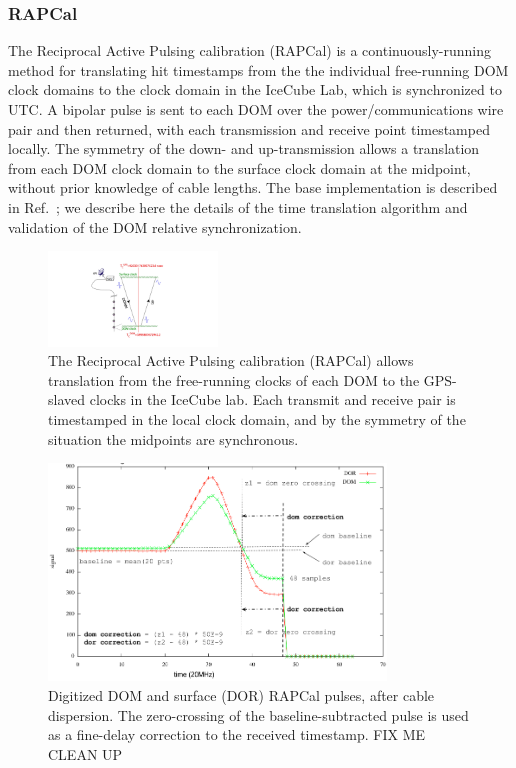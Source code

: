 \subsubsection{RAPCal}

The Reciprocal Active Pulsing calibration (RAPCal) is a
continuously-running method for translating hit timestamps from the the
individual free-running DOM clock domains to the clock domain in the
IceCube Lab, which is synchronized to UTC.  A bipolar pulse is sent to each
DOM over the power/communications wire pair and then returned, with each
transmission and receive point timestamped locally.  The symmetry of the down-
and up-transmission allows a translation from each DOM clock domain to the
surface clock domain at the midpoint, without prior knowledge of cable lengths.
The base implementation is described in Ref.~\cite{ICECUBE:DAQ}; we
describe here the details of the time translation algorithm and validation
of the DOM relative synchronization. 

\begin{figure}[!h]
 \centering
 \includegraphics[width=0.4\textwidth]{graphics/dom/rapcal/rapcal_symmetry.pdf}
 \caption{The Reciprocal Active Pulsing calibration (RAPCal) allows
   translation from the free-running clocks of each DOM to the GPS-slaved
   clocks in the IceCube lab.  Each transmit and receive pair is
   timestamped in the local clock domain, and by the symmetry of the
   situation the midpoints are synchronous.}
 \label{fig:rapcal_symmetry}
\end{figure}

\begin{figure}[h]
 \centering
 \includegraphics[width=0.8\textwidth]{graphics/dom/rapcal/zero_crossing.png}
 \caption{Digitized DOM and surface (DOR) RAPCal pulses, after cable
   dispersion.  The zero-crossing of the baseline-subtracted pulse is used as a
   fine-delay correction to the received timestamp.  FIX ME CLEAN UP}
 \label{fig:rapcal_zero_crossing}
\end{figure}

